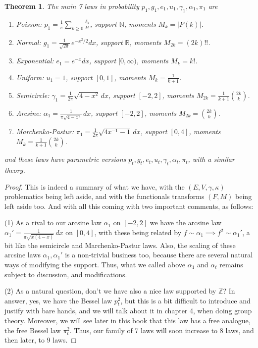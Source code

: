 \documentclass[12pt]{amsbook}
\newtheorem{theorem}{Theorem}[chapter]
\begin{document}
\begin{theorem}
The main 7 laws in probability $p_1,g_1,e_1,u_1,\gamma_1,\alpha_1,\pi_1$ are
\begin{enumerate}
\item Poisson: $p_1=\frac{1}{e}\sum_{k\geq0}\frac{\delta_k}{k!}$, support $\mathbb N$, moments $M_k=|P(k)|$.

\item Normal: $g_1=\frac{1}{\sqrt{2\pi}}\,e^{-x^2/2}dx$, support $\mathbb R$, moments $M_{2k}=(2k)!!$.

\item Exponential: $e_1=e^{-x}dx$, support $[0,\infty)$, moments $M_k=k!$.

\item Uniform: $u_1=1$, support $[0,1]$, moments $M_k=\frac{1}{k+1}$.

\item Semicircle: $\gamma_1=\frac{1}{2\pi}\sqrt{4-x^2}\,dx$, support $[-2,2]$, moments $M_{2k}=\frac{1}{k+1}\binom{2k}{k}$.

\item Arcsine: $\alpha_1=\frac{1}{\pi\sqrt{4-x^2}}\,dx$, support $[-2,2]$, moments $M_{2k}=\binom{2k}{k}$.

\item Marchenko-Pastur: $\pi_1=\frac{1}{2\pi}\sqrt{4x^{-1}-1}\,dx$, support $[0,4]$, moments $M_k=\frac{1}{k+1}\binom{2k}{k}$.
\end{enumerate}
and these laws have parametric versions $p_t,g_t,e_t,u_t,\gamma_t,\alpha_t,\pi_t$, with a similar theory.
\end{theorem}

\begin{proof}
This is indeed a summary of what we have, with the $(E,V,\gamma,\kappa)$ problematics being left aside, and with the functionals transforms $(F,M)$ being left aside too. And with all this coming with two important comments, as follows:

\medskip

(1) As a rival to our arcsine law $\alpha_1$ on $[-2,2]$ we have the arcsine law $\alpha_1'=\frac{1}{\pi\sqrt{x(4-x)}}\,dx$ on $[0,4]$, with these being related by $f\sim\alpha_1\implies f^2\sim\alpha_1'$, a bit like the semicircle and Marchenko-Pastur laws. Also, the scaling of these arcsine laws $\alpha_1,\alpha_1'$ is a non-trivial business too, because there are several natural ways of modifying the support. Thus, what we called above $\alpha_1$ and $\alpha_t$ remains subject to discussion, and modifications.

\medskip

(2) As a natural question, don't we have also a nice law supported by $\mathbb Z$? In answer, yes, we have the Bessel law $p^2_t$, but this is a bit difficult to introduce and justify with bare hands, and we will talk about it in chapter 4, when doing group theory. Moreover, we will see later in this book that this law has a free analogue, the free Bessel law $\pi^2_t$. Thus, our family of 7 laws will soon increase to 8 laws, and then later, to 9 laws.
\end{proof}
\end{document}
